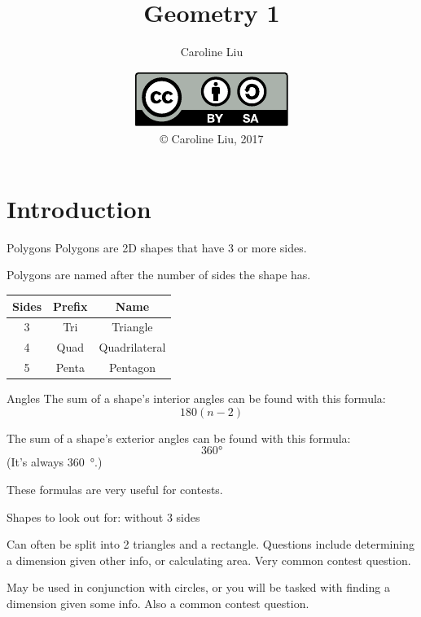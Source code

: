 

\usepackage{siunitx}
\usepackage{tikz}
\usepackage{tkz-euclide}


\title{Geometry 1}
\author{Caroline Liu}
\date{\includegraphics{../LicenseLogo}\\\copyright{} Caroline Liu, 2017}


	\frame{\titlepage}
	\section{Introduction}
	\begin{namedframe}{Polygons}
		Polygons are 2D shapes that have 3 or more sides.
		\pause

		Polygons are named after the number of sides the shape has.
		\pause

		\begin{center}
			\begin{tabular}{|c|c|c|}
				\hline
				Sides & Prefix & Name\\\hline
				3     & Tri    & Triangle\\
				4     & Quad   & Quadrilateral\\
				5     & Penta  & Pentagon\\\hline
			\end{tabular}
		\end{center}
	\end{namedframe}
	\begin{namedframe}{Angles}
		The sum of a shape's interior angles can be found with this formula:
		\[180(n-2)\]
		\pause

		The sum of a shape's exterior angles can be found with this formula:
		\[360\si{\degree}\]
		(It's always \SI{360}{\degree}.)
		\pause

		These formulas are \alert{very} useful for contests.
	\end{namedframe}
	\begin{namedframe}{Shapes to look out for: without 3 sides}
		\begin{description}[<+->]
			\item[Trapezoids] Can often be split into 2 triangles and a rectangle. Questions include determining a dimension given other info, or calculating area. Very common contest question.
			\item[Parallelograms, squares, and rectangles] May be used in conjunction with circles, or you will be tasked with finding a dimension given some info. Also a common contest question.
		\end{description}
	\end{namedframe}
